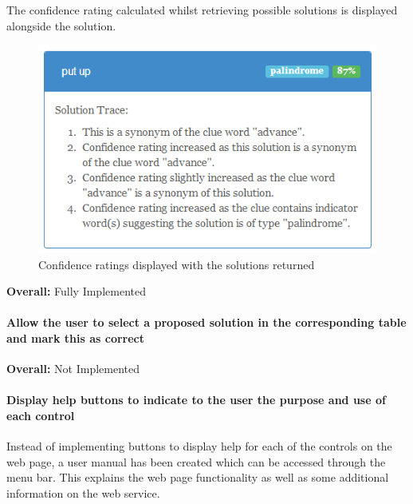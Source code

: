 The confidence rating calculated whilst retrieving possible solutions is displayed 
alongside the solution.

\begin{figure}[H]
	\centering
	\includegraphics[keepaspectratio=true]{evidence/confidence.png}
	\caption{Confidence ratings displayed with the solutions returned}
\end{figure}

{\bf Overall:} Fully Implemented

\paragraph{Allow the user to select a proposed solution in the corresponding table and mark this as correct}

{\bf Overall:} Not Implemented

\paragraph{Display help buttons to indicate to the user the purpose
and use of each control}

Instead of implementing buttons to display help for each of the controls on the web page, 
a user manual has been created which can be accessed through the menu bar. This explains 
the web page functionality as well as some additional information on the web service. 

